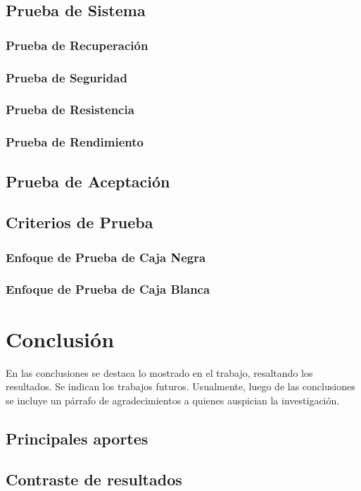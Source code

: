 \documentclass[letter,12pt]{report}
\begin{document}
\section{Prueba de Sistema}
\subsection{Prueba de Recuperación}
\subsection{Prueba de Seguridad}
\subsection{Prueba de Resistencia}
\subsection{Prueba de Rendimiento}
\section{Prueba de Aceptación}
\section{Criterios de Prueba}
\subsection{Enfoque de Prueba de Caja Negra}
\subsection{Enfoque de Prueba de Caja Blanca}



\chapter{Conclusión}\label{conclusion}
En las conclusiones se destaca lo mostrado en el trabajo, resaltando los resultados. Se indican los trabajos futuros. Usualmente, luego de las conclusiones se incluye un párrafo de agradecimientos a quienes auspician la investigación.
\section{Principales aportes}
\section{Contraste de resultados}
\end{document}
